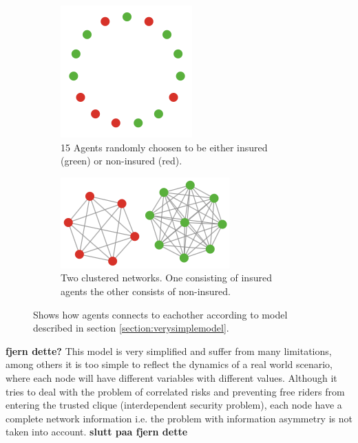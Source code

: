 \begin{figure}[h]
\centering
\begin{subfigure}{.5\textwidth}
  \centering
  \includegraphics[width=0.4\linewidth]{../Figures/firstModelWithNoParameters1.png}
  \caption{\label{fig:firstmod1} 15 Agents randomly choosen to be either insured (green) or non-insured (red).}
\end{subfigure}
\quad
\begin{subfigure}{.46\textwidth}
  \centering
  \includegraphics[width=0.8\linewidth]{../Figures/firstModelWithNoParameters2.png}
  \caption{\label{fig:firstmod2} Two clustered networks. One consisting of insured agents the other consists of non-insured.}
\end{subfigure}
\caption{\label{fig:firstmodfinal} Shows how agents connects to eachother according to model described in section \ref{section:verysimplemodel}.}
\end{figure}
 
\textbf{fjern dette?}
This model is very simplified and suffer from many limitations, among others it is too simple to reflect the dynamics of a real world scenario, where each node will have different variables with different values. Although it tries to deal with the problem of correlated risks and preventing free riders from entering the trusted clique (interdependent security problem), each node have a complete network information i.e. the problem with information asymmetry is not taken into account. 
\textbf{slutt paa fjern dette}

